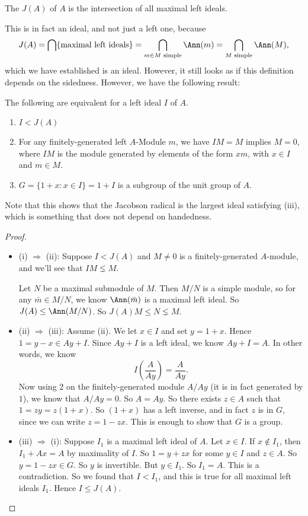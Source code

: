 \documentclass[a4paper]{article}
\begin{document}
\begin{defi}
  The  $J(A)$ of $A$ is the intersection of all maximal left ideals.
\end{defi}
This is in fact an ideal, and not just a left one, because
\[
  J(A) = \bigcap \{\text{maximal left ideals}\} = \bigcap_{m \in M\text{ simple}} \Ann(m) = \bigcap_{M\text{ simple}} \Ann(M),
\]
which we have established is an ideal. However, it still looks as if this definition depends on the sidedness. However, we have the following result:
\begin{lemma}
  The following are equivalent for a left ideal $I$ of $A$.
  \begin{enumerate}
    \item $I < J(A)$
    \item For any finitely-generated left $A$-Module $m$, we have $IM = M$ implies $M = 0$, where $IM$ is the module generated by elements of the form $xm$, with $x \in I$ and $m \in M$.
    \item $G = \{1 + x: x \in I\} = 1 + I$ is a subgroup of the unit group of $A$.
  \end{enumerate}
\end{lemma}
Note that this shows that the Jacobson radical is the largest ideal satisfying (iii), which is something that does not depend on handedness.

\begin{proof}\leavevmode
  \begin{itemize}
    \item (i) $\Rightarrow$ (ii): Suppose $I < J(A)$ and $M \not= 0$ is a finitely-generated $A$-module, and we'll see that $IM \lneq M$.

      Let $N$ be a maximal submodule of $M$. Then $M/N$ is a simple module, so for any $\bar{m} \in M/N$, we know $\Ann(\bar{m})$ is a maximal left ideal. So $J(A) \leq \Ann(M/N)$. So $J(A) M \leq N \lneq M$.
    \item (ii) $\Rightarrow$ (iii): Assume (ii). We let $x \in I$ and set $y = 1 + x$. Hence $1 = y - x \in Ay + I$. Since $Ay + I$ is a left ideal, we know $Ay + I = A$. In other words, we know
      \[
        I \left(\frac{A}{Ay}\right) = \frac{A}{Ay}.
      \]
      Now using $2$ on the finitely-generated module $A/Ay$ (it is in fact generated by $1$), we know that $A/Ay = 0$. So $A = Ay$. So there exists $z \in A$ such that $1 = zy = z(1 + x)$. So $(1 + x)$ has a left inverse, and in fact $z$ is in $G$, since we can write $z = 1 - zx$. This is enough to show that $G$ is a group.
    \item (iii) $\Rightarrow$ (i): Suppose $I_1$ is a maximal left ideal of $A$. Let $x \in I$. If $x \not \in I_1$, then $I_1 + Ax = A$ by maximality of $I$. So $1 = y + zx$ for some $y \in I$ and $z \in A$. So $y = 1 - zx \in G$. So $y$ is invertible. But $y \in I_1$. So $I_1 = A$. This is a contradiction. So we found that $I < I_1$, and this is true for all maximal left ideals $I_1$. Hence $I \leq J(A)$.
  \end{itemize}
\end{proof}
\end{document}
